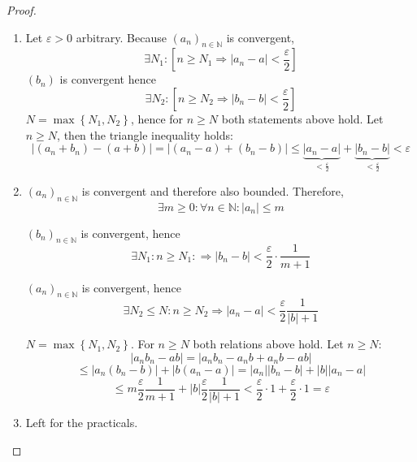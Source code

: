 \documentclass[a4paper,landscape,twocolumn]{article}
\theoremstyle{definition}
\newcommand\set[1]{\left\{#1\right\}}
\newcommand\abs[1]{\left|#1\right|}
\newcommand\seq[1]{{\left(#1\right)}_{n \in \mathbb N}}
\begin{document}
\begin{proof}
  \begin{enumerate}
    \item Let $\varepsilon > 0$ arbitrary. Because $(a_n)_{n \in \mathbb N}$ is convergent,
      \[ \exists N_1: \left[n \geq N_1 \Rightarrow \abs{a_n - a} < \frac{\varepsilon}{2}\right] \]
      $(b_n)$ is convergent hence
      \[ \exists N_2: \left[n \geq N_2 \Rightarrow \abs{b_n - b} < \frac{\varepsilon}2\right] \]
      $N = \max\set{N_1, N_2}$, hence for $n \geq N$ both statements above hold.
      Let $n \geq N$, then the triangle inequality holds:
      \[
          \abs{(a_n + b_n) - (a + b)}
          = \abs{(a_n - a) + (b_n - b)}
          \leq \underbrace{\abs{a_n - a}}_{<\frac\varepsilon2} + \underbrace{\abs{b_n - b}}_{<\frac\varepsilon2} < \varepsilon
      \]

    \item $(a_n)_{n \in \mathbb N}$ is convergent and therefore also bounded. Therefore,
      \[ \exists m \geq 0: \forall n \in \mathbb N: \abs{a_n} \leq m \]

      $\seq{b_n}$ is convergent, hence
      \[ \exists N_1: n \geq N_1: \Rightarrow \abs{b_n - b} < \frac\varepsilon2 \cdot \frac1{m+1} \]

      $(a_n)_{n \in \mathbb N}$ is convergent, hence
      \[ \exists N_2 \leq N: n \geq N_2 \Rightarrow \abs{a_n - a} < \frac\varepsilon2 \frac{1}{\abs{b} + 1} \]

      $N = \max\set{N_1, N_2}$. For $n \geq N$ both relations above hold.
      Let $n \geq N:$
      \[
          \abs{a_n b_n - ab}
          = \abs{a_n b_n - a_n b + a_n b - ab}
      \] \[
          \leq \abs{a_n (b_n - b)} + \abs{b(a_n - a)} = \abs{a_n} \abs{b_n - b} + \abs{b} \abs{a_n - a}
      \] \[
          \leq m \frac{\varepsilon}{2} \frac{1}{m+1} + \abs{b} \frac{\varepsilon}{2} \frac{1}{\abs{b} + 1} < \frac{\varepsilon}{2} \cdot 1 + \frac{\varepsilon}{2} \cdot 1 = \varepsilon
      \]
    \item Left for the practicals.
  \end{enumerate}
\end{proof}
\end{document}
